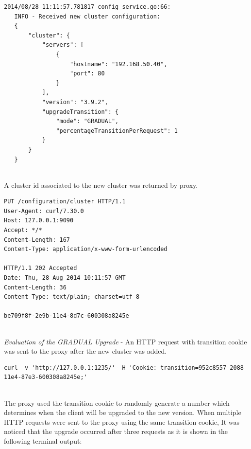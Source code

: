 \documentclass[a4paper,11pt,twoside]{report}
\begin{document}
\begin{lstlisting}[language=terminal]
2014/08/28 11:11:57.781817 config_service.go:66:     
   INFO - Received new cluster configuration:
   {
       "cluster": {
           "servers": [
               {
                   "hostname": "192.168.50.40", 
                   "port": 80
               }
           ], 
           "version": "3.9.2", 
           "upgradeTransition": {
               "mode": "GRADUAL", 
               "percentageTransitionPerRequest": 1
           }
       }
   }
\end{lstlisting}

\noindent\\ 
A cluster id associated to the new cluster was returned by proxy.\smallskip

\begin{lstlisting}[language=terminal]
PUT /configuration/cluster HTTP/1.1
User-Agent: curl/7.30.0
Host: 127.0.0.1:9090
Accept: */*
Content-Length: 167
Content-Type: application/x-www-form-urlencoded
 
HTTP/1.1 202 Accepted
Date: Thu, 28 Aug 2014 10:11:57 GMT
Content-Length: 36
Content-Type: text/plain; charset=utf-8
 
be709f8f-2e9b-11e4-8d7c-600308a8245e
\end{lstlisting}

\noindent\\
\textit{Evaluation of the GRADUAL Upgrade} - An HTTP request with transition cookie was sent to the proxy after the new cluster was added.\smallskip

\begin{lstlisting}[language=terminal]
curl -v 'http://127.0.0.1:1235/' -H 'Cookie: transition=952c8557-2088-11e4-87e3-600308a8245e;'
\end{lstlisting}

\noindent\\
The proxy used the transition cookie to randomly generate a number which determines when the client will be upgraded to the new version. When multiple HTTP requests were sent to the proxy using the same transition cookie, It was noticed that the upgrade occurred after three requests as it is shown in the following terminal output: \smallskip
\end{document}
